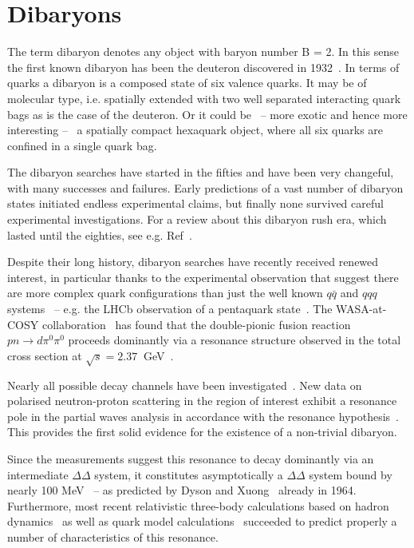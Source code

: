 %
\chapter{Dibaryons} \label{sec:2}



The term dibaryon denotes any object with baryon number B = 2. In this sense the first known dibaryon
has been the deuteron discovered in 1932~\cite{deu_disc}.
In terms of quarks a dibaryon is a composed state of six valence quarks.
It may be of molecular type, i.e. spatially extended with two well separated interacting quark 
bags as is the case of the deuteron. Or it could be \ -- more exotic and hence more interesting -- \ 
a spatially compact hexaquark object, where all six quarks are confined in a single quark bag.

The dibaryon searches have started in the fifties and have been very changeful, with many 
successes and failures. 
Early predictions of a vast number of dibaryon states initiated endless experimental claims,
but finally none survived careful experimental investigations. 
For a review about this dibaryon rush era, which lasted until the eighties, 
see e.g. Ref~\cite{rev1,rev2,rev3,rev4,rev5}.

Despite their long history, dibaryon searches have recently received renewed interest,
in particular thanks to the experimental observation that suggest there are more complex quark configurations than just the 
well known $q\bar{q}$ and $qqq$ systems \ -- e.g. the LHCb observation of a pentaquark 
state~\cite{lhcbpenta}.
The WASA-at-COSY collaboration~\cite{wasaref} has found that the double-pionic fusion reaction 
$pn \rightarrow d \pi^{0} \pi^{0}$ proceeds dominantly via a resonance structure observed in the total 
cross section at $\sqrt{s} = 2.37\ $ GeV~\cite{wasa1}. 


Nearly all possible decay channels have been investigated~\cite{wasa2, wasa3, wasa4}.
New data on polarised neutron-proton scattering in the region of interest exhibit a resonance pole in 
the partial waves analysis in accordance with the resonance hypothesis~\cite{wasa5,wasa6}.
This provides the first solid evidence for the existence of a non-trivial dibaryon.

Since the measurements suggest this resonance to decay dominantly via an intermediate $\Delta \Delta$
system, it constitutes asymptotically a $\Delta \Delta$ system bound by nearly 100 MeV \ -- as 
predicted by Dyson and Xuong~\cite{dysonxuong} already in 1964.
Furthermore, most recent relativistic three-body calculations based on hadron dynamics~\cite{haddin}
as well as quark model calculations~\cite{dsqm1,dsqm2} succeeded to predict properly a number
of characteristics of this resonance.

